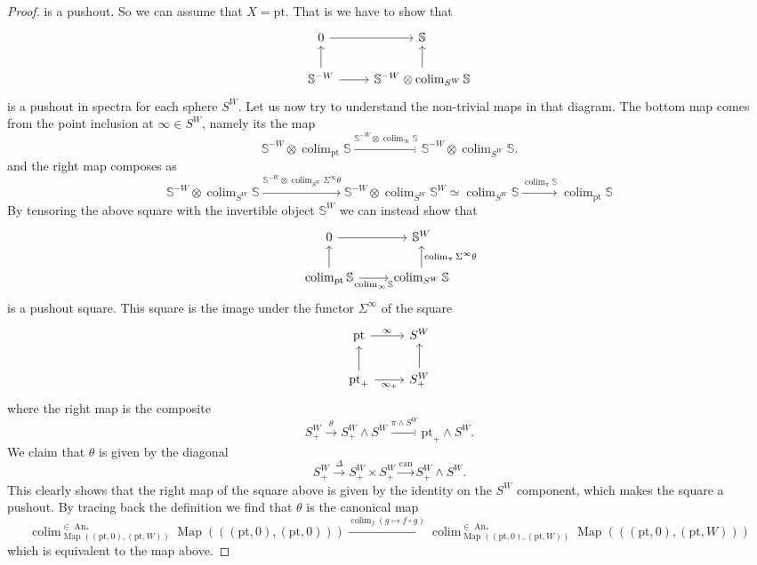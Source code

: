 \documentclass{article}
\newcommand{\xto}{\xrightarrow}
\newcommand{\pt}{\mathrm{pt}}
\DeclareMathOperator{\An}{An}
\DeclareMathOperator{\Map}{Map}
\DeclareMathOperator*{\colim}{colim}
\begin{document}
\begin{proof}
is a pushout. 
So we can assume that $X = \pt$. That is we have to show that 
\[\begin{tikzcd}
	0 & {\mathbb S} \\
	{\mathbb S^{-W}} & {\mathbb S^{-W}\otimes \colim_{S^W} \mathbb S}
	\arrow[to=1-2, from=1-1]
	\arrow[to=1-1, from=2-1]
	\arrow[to=1-2, from=2-2]
	\arrow[to=2-2, from=2-1]
\end{tikzcd}\]
is a pushout in spectra for each sphere $S^W$.
Let us now try to understand the non-trivial maps in that diagram.
The bottom map comes from the point inclusion at $\infty \in S^W$, namely its the map 
\[
\mathbb S^{-W} \otimes \colim_{\pt} \mathbb S \xto{\mathbb S^{-W}\otimes \colim_{\infty} \mathbb S} \mathbb S^{-W} \otimes \colim_{S^W} \mathbb S.
\]
and the right map composes as 
\[
\mathbb S^{-W} \otimes \colim_{S^W} \mathbb S \xto{\mathbb S^{-W}\otimes \colim_{S^W} \Sigma^\infty \theta} \mathbb S^{-W} \otimes \colim_{S^W} \mathbb S^W \simeq \colim_{S^W}\mathbb S \xto{\colim_\pi \mathbb S} \colim_\pt \mathbb S    
\]
By tensoring the above square with the invertible object $\mathbb S^W$ we can instead show that
\[\begin{tikzcd}
	0 & {\mathbb S^W} \\
	{\colim_\pt \mathbb S} & {\colim_{S^W} \mathbb S}
	\arrow[from=1-1, to=1-2]
	\arrow[from=2-1, to=1-1]
	\arrow["{\colim_\infty \mathbb S}"', from=2-1, to=2-2]
	\arrow["{\colim_{\pi}\Sigma^\infty\theta}"', from=2-2, to=1-2]
\end{tikzcd}\]
is a pushout square.
This square is the image under the functor $\Sigma^\infty$ of the square 
\[\begin{tikzcd}
	\pt & {S^W} \\
	{\pt_+} & {S^W_+}
	\arrow["\infty", from=1-1, to=1-2]
	\arrow[from=2-2, to=1-2]
	\arrow[from=2-1, to=1-1]
	\arrow["{\infty_+}"', from=2-1, to=2-2]
\end{tikzcd}\]
where the right map is the composite 
\[
S^W_+ \xto{\theta} S^W_+ \wedge S^W \xto{\pi \wedge S^W} \pt_+ \wedge S^W.    
\]
We claim that $\theta$ is given by the diagonal 
\[
S^W_+ \xto{\Delta} S^W_+ \times S^W_+ \xto{\mathrm{can}} S^W_+ \wedge S^W.
\]
This clearly shows that the right map of the square above is given by the identity on the $S^W$ component, which 
makes the square a pushout.
By tracing back the definition we find that $\theta$ is the canonical map 
\[
  \colim^{\in \An_*}_{\Map((\pt,0),(\pt,W))}  \Map(((\pt,0),(\pt,0))) \xto{\colim_f (g \mapsto f \circ g)} \colim^{\in \An_*}_{\Map((\pt,0),(\pt,W))} \Map(((\pt,0),(\pt,W)))
\]
which is equivalent to the map above.
\end{proof}
\end{document}
